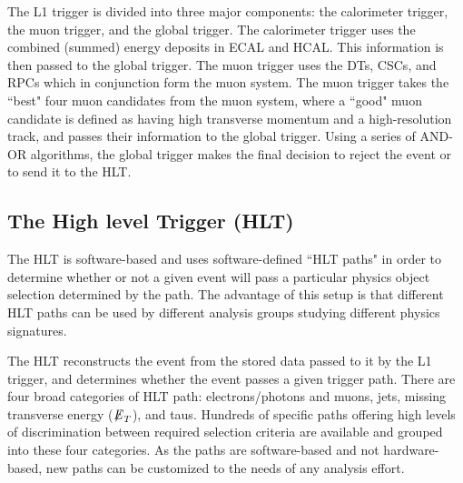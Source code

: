 The L1 trigger is divided into three major components: the calorimeter trigger, the muon trigger, and the global trigger. The calorimeter trigger uses the combined (summed) energy deposits in ECAL and HCAL. This information is then passed to the global trigger. The muon trigger uses the DTs, CSCs, and RPCs which in conjunction form the muon system. The muon trigger takes the ``best" four muon candidates from the muon system, where a ``good" muon candidate is defined as having high transverse momentum and a high-resolution track, and passes their information to the global trigger. Using a series of AND-OR algorithms, the global trigger makes the final decision to reject the event or to send it to the HLT.

\subsection{The High level Trigger (HLT)}

The HLT is software-based and uses software-defined ``HLT paths" in order to determine whether or not a given event will pass a particular physics object selection determined by the path. The advantage of this setup is that different HLT paths can be used by different analysis groups studying different physics signatures.

The HLT reconstructs the event from the stored data passed to it by the L1 trigger, and determines whether the event passes a given trigger path. There are four broad categories of HLT path: electrons/photons and muons, jets, missing transverse energy (${\not\mathrel{E}}_T$), and taus. Hundreds of specific paths offering high levels of discrimination between required selection criteria are available and grouped into these four categories. As the paths are software-based and not hardware-based, new paths can be customized to the needs of any analysis effort.
